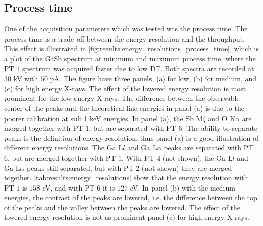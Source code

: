 





\subsection{Process time}
\label{results:process_time}

One of the acquisition parameters which was tested was the process time.
The process time is a trade-off between the energy resolution and the throughput.
This effect is illustrated in \cref{fig:results:energy_resolutions_process_time}, which is a plot of the GaSb spectrum at minimum and maximum process time, where the PT $1$ spectrum was acquired faster due to low DT.
Both spectra are recorded at $30$ kV with $50$ pA.
The figure have three panels, (a) for low, (b) for medium, and (c) for high energy X-rays.
The effect of the lowered energy resolution is most prominent for the low energy X-rays.
The difference between the observable center of the peaks and the theoretical line energies in panel (a) is due to the poorer calibration at sub 1 keV energies.
In panel (a), the Sb M$\zeta$ and O K$\alpha$ are merged together with PT $1$, but are separated with PT $6$.
The ability to separate peaks is the definition of energy resolution, thus panel (a) is a good illustration of different energy resolutions.
The Ga L$l$ and Ga L$\alpha$ peaks are separated with PT $6$, but are merged together with PT $1$.
With PT $4$ (not shown), the Ga L$l$ and Ga L$\alpha$ peaks still separated, but with PT $2$ (not shown) they are merged together.
\cref{tab:results:energy_resolutions} show that the energy resolution with PT $1$ is $158$ eV, and with PT $6$ it is $127$ eV.
In panel (b) with the medium energies, the contrast of the peaks are lowered, i.e. the difference between the top of the peaks and the valley between the peaks are lowered.
The effect of the lowered energy resolution is not as prominent panel (c) for high energy X-rays.



